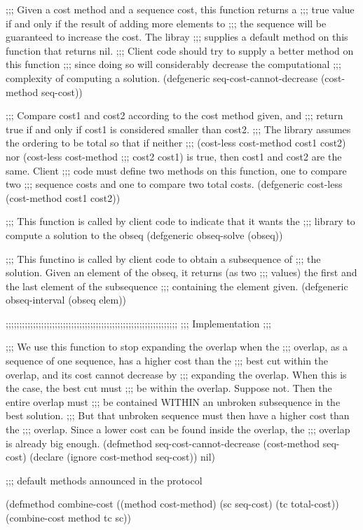 ;;; Given a cost method and a sequence cost, this function returns a
;;; true value if and only if the result of adding more elements to
;;; the sequence will be guaranteed to increase the cost.  The libray
;;; supplies a default method on this function that returns nil.
;;; Client code should try to supply a better method on this function
;;; since doing so will considerably decrease the computational
;;; complexity of computing a solution.
(defgeneric seq-cost-cannot-decrease (cost-method seq-cost))

;;; Compare cost1 and cost2 according to the cost method given, and
;;; return true if and only if cost1 is considered smaller than cost2.
;;; The library assumes the ordering to be total so that if neither
;;; (cost-less cost-method cost1 cost2) nor (cost-less cost-method
;;; cost2 cost1) is true, then cost1 and cost2 are the same.  Client
;;; code must define two methods on this function, one to compare two
;;; sequence costs and one to compare two total costs.
(defgeneric cost-less (cost-method cost1 cost2))

;;; This function is called by client code to indicate that it wants the
;;; library to compute a solution to the obseq
(defgeneric obseq-solve (obseq))

;;; This functino is called by client code to obtain a subsequence of
;;; the solution.  Given an element of the obseq, it returns (as two
;;; values) the first and the last element of the subsequence
;;; containing the element given. 
(defgeneric obseq-interval (obseq elem))

;;;;;;;;;;;;;;;;;;;;;;;;;;;;;;;;;;;;;;;;;;;;;;;;;;;;;;;;;;;;;;;
;;; Implementation
;;;

;;; We use this function to stop expanding the overlap when the
;;; overlap, as a sequence of one sequence, has a higher cost than the
;;; best cut within the overlap, and its cost cannot decrease by
;;; expanding the overlap.  When this is the case, the best cut must
;;; be within the overlap.  Suppose not.  Then the entire overlap must
;;; be contained WITHIN an unbroken subsequence in the best solution.
;;; But that unbroken sequence must then have a higher cost than the
;;; overlap.  Since a lower cost can be found inside the overlap, the
;;; overlap is already big enough.
(defmethod seq-cost-cannot-decrease (cost-method seq-cost)
  (declare (ignore cost-method seq-cost))
  nil)

;;; default methods announced in the protocol 

(defmethod combine-cost ((method cost-method) (sc seq-cost) (tc total-cost))
  (combine-cost method tc sc))

